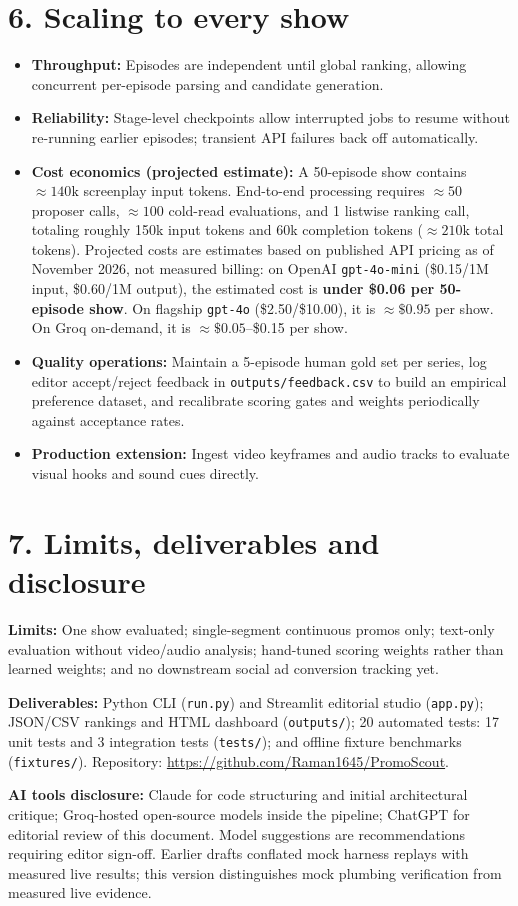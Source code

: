 \documentclass[10pt,a4paper]{extarticle}
\begin{document}
\section{6. Scaling to every show}
\begin{itemize}
\item \textbf{Throughput:} Episodes are independent until global ranking, allowing concurrent per-episode parsing and candidate generation.
\item \textbf{Reliability:} Stage-level checkpoints allow interrupted jobs to resume without re-running earlier episodes; transient API failures back off automatically.
\item \textbf{Cost economics (projected estimate):} A 50-episode show contains $\approx 140\text{k}$ screenplay input tokens. End-to-end processing requires $\approx 50$ proposer calls, $\approx 100$ cold-read evaluations, and 1 listwise ranking call, totaling roughly 150k input tokens and 60k completion tokens ($\approx 210\text{k}$ total tokens). Projected costs are estimates based on published API pricing as of November 2026, not measured billing: on OpenAI \texttt{gpt-4o-mini} (\$0.15/1M input, \$0.60/1M output), the estimated cost is \textbf{under \$0.06 per 50-episode show}. On flagship \texttt{gpt-4o} (\$2.50/\$10.00), it is $\approx \$0.95$ per show. On Groq on-demand, it is $\approx \$0.05$--\$0.15 per show.
\item \textbf{Quality operations:} Maintain a 5-episode human gold set per series, log editor accept/reject feedback in \texttt{outputs/feedback.csv} to build an empirical preference dataset, and recalibrate scoring gates and weights periodically against acceptance rates.
\item \textbf{Production extension:} Ingest video keyframes and audio tracks to evaluate visual hooks and sound cues directly.
\end{itemize}

\section{7. Limits, deliverables and disclosure}
\textbf{Limits:} One show evaluated; single-segment continuous promos only; text-only evaluation without video/audio analysis; hand-tuned scoring weights rather than learned weights; and no downstream social ad conversion tracking yet.

\textbf{Deliverables:} Python CLI (\texttt{run.py}) and Streamlit editorial studio (\texttt{app.py}); JSON/CSV rankings and HTML dashboard (\texttt{outputs/}); 20 automated tests: 17 unit tests and 3 integration tests (\texttt{tests/}); and offline fixture benchmarks (\texttt{fixtures/}). Repository: \url{https://github.com/Raman1645/PromoScout}.

\textbf{AI tools disclosure:} Claude for code structuring and initial architectural critique; Groq-hosted open-source models inside the pipeline; ChatGPT for editorial review of this document. Model suggestions are recommendations requiring editor sign-off. Earlier drafts conflated mock harness replays with measured live results; this version distinguishes mock plumbing verification from measured live evidence.
\end{document}
